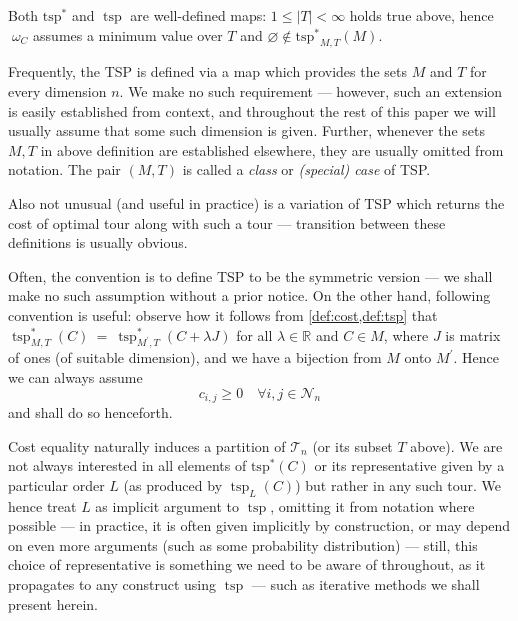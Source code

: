 \documentclass[index=totoc,bibliography=totoc]{scrartcl}
\numberwithin{equation}{section}
\numberwithin{figure}{section}
\numberwithin{table}{section}
\let\defstyle\itshape
\begin{document}
\begin{remark}
  Both $\operatorname{tsp^\ast}$ and $\operatorname{tsp}$ are well-defined maps:
  $1 \leq \left|T\right| < \infty$ holds true above, hence $\;\omega_C$ assumes a minimum
  value over $T$ and $\varnothing \notin \operatorname{tsp^\ast}_{M,T}\left(M\right)$.
\end{remark}

\begin{remark}
Frequently, the TSP is defined via a map which provides the sets $M$ and
$T$ for every dimension $n$.  We make no such requirement --- however, such
an extension is easily established from context, and throughout the rest of
this paper we will usually assume that some such dimension is given.
Further, whenever the sets $M,T$ in above definition are established elsewhere,
they are usually omitted from notation.  The pair $(M,T)$ is called a
{\defstyle class} or {\defstyle (special) case} of TSP.
\end{remark}

\begin{remark}
  Also not unusual (and useful in practice) is a variation of TSP which
  returns the cost of optimal tour along with such a tour --- transition
  between these definitions is usually obvious.
\end{remark}

\begin{remark}
Often, the convention is to define TSP to be the symmetric version
--- we shall make no such assumption without a prior notice.
On the other hand, following convention is useful:
observe how it follows from \cref{def:cost,def:tsp} that
$\operatorname{tsp}_{M,T}^\ast\left(C\right) ~ = ~
 \operatorname{tsp}_{M^\prime,T}^\ast\left(C + \lambda J\right)$
for all $\lambda \in \mathbb{R}$ and $C \in M$,
where $J$ is matrix of ones (of suitable dimension),
and we have a bijection from $M$ onto $M^\prime$.
Hence we can always assume
\[
  c_{i,j} \geq 0 \quad \forall i,j \in \mathcal{N}_n
\]
and shall do so henceforth.
\end{remark}

\begin{remark}
\label{rem:order}
  Cost equality naturally induces a partition of $\mathcal{T}_n$ (or its
  subset $T$ above).  We are not always interested in all elements of
  $\operatorname{tsp^\ast}\left(C\right)$ or its representative given by a
  particular order $L$ (as produced by $\operatorname{tsp}_L\left(C\right)$)
  but rather in any such tour.
  We hence treat $L$ as implicit argument
  to $\operatorname{tsp}$, omitting it from notation where possible ---
  in practice, it is often given implicitly by construction, or may depend
  on even more arguments (such as some probability distribution) ---
  still, this choice of representative is something we need to be aware of
  throughout, as it propagates to any construct using $\operatorname{tsp}$ ---
  such as iterative methods we shall present herein.
\end{remark}
\end{document}
